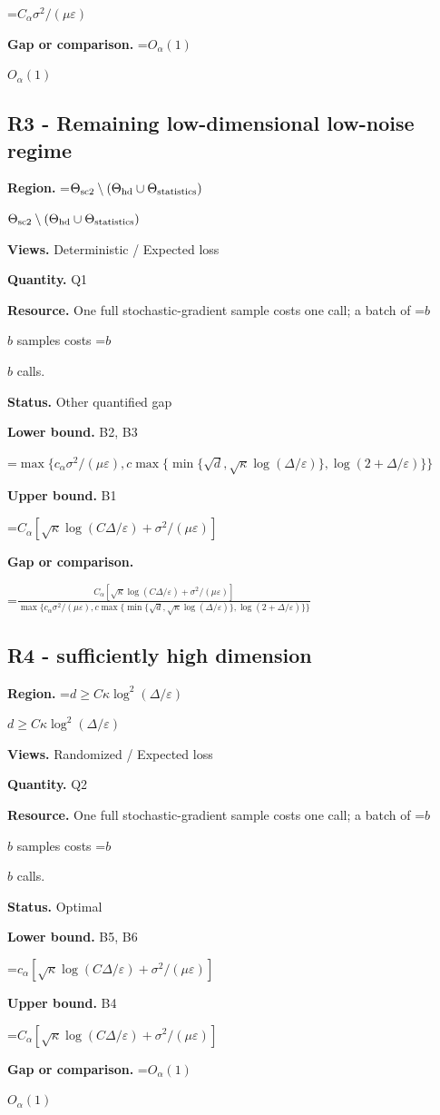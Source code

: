 \documentclass[10pt,a4paper]{article}
\newcommand{\AtlasMath}[1]{\par\begingroup\centering\setbox0=\hbox{$\displaystyle #1$}\ifdim\wd0>1.4\linewidth\typeout{ATLAS WIDE FORMULA: \the\wd0}\fi\ifdim\wd0>\linewidth\resizebox{\linewidth}{!}{\box0}\else\box0\fi\par\endgroup}
\newcommand{\AtlasInlineMath}[1]{\begingroup\setbox0=\hbox{$#1$}\ifdim\wd0>.4\linewidth\endgroup\AtlasMath{#1}\else\endgroup$#1$\fi}
\begin{document}
\AtlasMath{C_\alpha \sigma^2/(\mu\varepsilon)}
\textbf{Gap or comparison.} \AtlasInlineMath{O_\alpha(1)}

\subsection{R3 - Remaining low-dimensional low-noise regime}
\textbf{Region.} \AtlasInlineMath{\Theta_{\rm sc2}\setminus(\Theta_{\rm hd}\cup\Theta_{\rm statistics})}

\textbf{Views.} Deterministic / Expected loss

\textbf{Quantity.} Q1

\textbf{Resource.} One full stochastic-gradient sample costs one call; a batch of \AtlasInlineMath{b} samples costs \AtlasInlineMath{b} calls.

\textbf{Status.} Other quantified gap

\textbf{Lower bound.} B2, B3

\AtlasMath{\max\{c_\alpha \sigma^2/(\mu\varepsilon),c\max\{\min\{\sqrt d,\sqrt\kappa\log(\Delta/\varepsilon)\},\log(2+\Delta/\varepsilon)\}\}}
\textbf{Upper bound.} B1

\AtlasMath{C_\alpha[\sqrt\kappa\log(C\Delta/\varepsilon)+\sigma^2/(\mu\varepsilon)]}
\textbf{Gap or comparison.} 
\AtlasMath{\frac{C_\alpha[\sqrt\kappa\log(C\Delta/\varepsilon)+\sigma^2/(\mu\varepsilon)]}{\max\{c_\alpha \sigma^2/(\mu\varepsilon),c\max\{\min\{\sqrt d,\sqrt\kappa\log(\Delta/\varepsilon)\},\log(2+\Delta/\varepsilon)\}\}}}


\subsection{R4 - sufficiently high dimension}
\textbf{Region.} \AtlasInlineMath{d\ge C\kappa\log^2(\Delta/\varepsilon)}

\textbf{Views.} Randomized / Expected loss

\textbf{Quantity.} Q2

\textbf{Resource.} One full stochastic-gradient sample costs one call; a batch of \AtlasInlineMath{b} samples costs \AtlasInlineMath{b} calls.

\textbf{Status.} Optimal

\textbf{Lower bound.} B5, B6

\AtlasMath{c_\alpha[\sqrt\kappa\log(C\Delta/\varepsilon)+\sigma^2/(\mu\varepsilon)]}
\textbf{Upper bound.} B4

\AtlasMath{C_\alpha[\sqrt\kappa\log(C\Delta/\varepsilon)+\sigma^2/(\mu\varepsilon)]}
\textbf{Gap or comparison.} \AtlasInlineMath{O_\alpha(1)}
\end{document}
